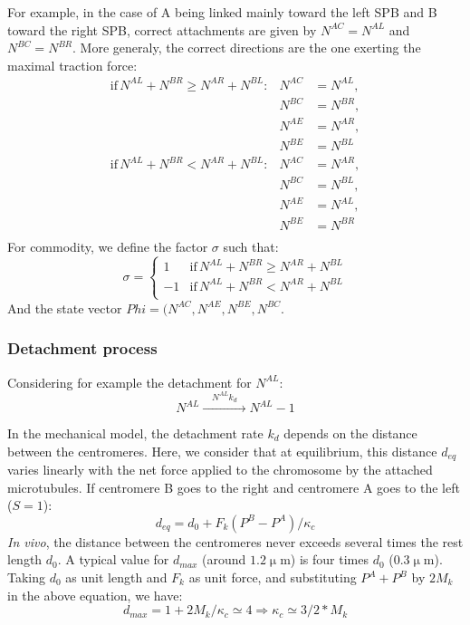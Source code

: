 \documentclass[a4paper,12pt]{article}
\newcommand{\UM}{\upmu\mbox{m}}
\begin{document}
For example, in the case of A being linked mainly toward the left SPB
and B toward the right SPB, correct attachments are given by $ N^{AC}
= N^{AL}$ and $N^{BC} = N^{BR}$. More generaly, the correct directions
are the one exerting the maximal traction force:
\begin{equation}
  \label{eq:corect_erron}
  \begin{aligned}
    \mathrm{if}\, N^{AL} +  N^{BR} \geq N^{AR} +  N^{BL}:& N^{AC}&= N^{AL},\\
                                                      &  N^{BC}&= N^{BR},\\
                                                      &  N^{AE}&= N^{AR},\\
                                                      &  N^{BE}&= N^{BL}\\
    \mathrm{if}\, N^{AL} +  N^{BR} < N^{AR} +  N^{BL}  :&  N^{AC}&= N^{AR},\\
                                                      &  N^{BC}&= N^{BL},\\
                                                      &  N^{AE}&= N^{AL},\\
                                                      &  N^{BE}&= N^{BR}\\
  \end{aligned}
\end{equation}
For commodity, we define the factor $\sigma$ such that:
\begin{equation}
  \label{eq:factS}
  \sigma =%
  \begin{cases}
    1 &\mathrm{if}\, N^{AL} +  N^{BR} \geq N^{AR} +  N^{BL}\\
    -1 &\mathrm{if}\, N^{AL} +  N^{BR} < N^{AR} +  N^{BL}\\
  \end{cases}
\end{equation}
And the state vector $Phi = (N^{AC}, N^{AE}, N^{BE}, N^{BC}$.


\subsubsection{Detachment process}

Considering for example the detachment for $N^{AL}$:
\begin{equation}
    N^{AL} \xrightarrow{\quad N^{AL}k_d \quad} N^{AL}- 1%
\end{equation}

In the mechanical model, the detachment rate $k_d$ depends on the
distance between the centromeres. Here, we consider that at
equilibrium, this distance $d_{eq}$ varies linearly with the net force
applied to the chromosome by the attached microtubules. If centromere
B goes to the right and centromere A goes to the left ($S = 1$):
$$ d_{eq} = d_0 + F_k (P^B - P^A)/\kappa_c$$
\emph{In vivo}, the distance between the centromeres
never exceeds several times the rest length $d_0$. A typical value for
$d_{max}$ (around $1.2 \UM$) is four times $d_0$ ($0.3 \UM$). Taking
$d_0$ as unit length and $F_k$ as unit force, and substituting $P^A +
P^B$ by $2M_k$ in the above equation, we have:
$$ 
d_{max} = 1 + 2M_k/\kappa_c  \simeq 4 \Rightarrow \kappa_c \simeq 3/2*M_k
$$
\end{document}
